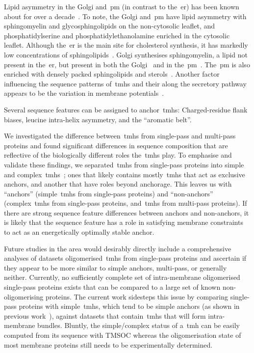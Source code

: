 Lipid asymmetry in the Golgi and~\gls{pm} (in contrast to the~\gls{er}) has been known about for over a decade~\cite{Daleke2007, Devaux2004}.
To note, the Golgi and~\gls{pm} have lipid asymmetry with sphingomyelin and glycosphingolipids on the non-cytosolic leaflet, and phosphatidylserine and phosphatidylethanolamine enriched in the cytosolic leaflet.
Although the~\gls{er} is the main site for cholesterol synthesis, it has markedly low concentrations of sphingolipids~\cite{Bell1981}.
Golgi synthesises sphingomyelin, a lipid not present in the~\gls{er}, but present in both the Golgi~\cite{Futerman2005} and in the~\gls{pm}~\cite{Li2007, Tafesse2007}.
The~\gls{pm} is also enriched with densely packed sphingolipids and sterols~\cite{Paolo2006}.
Another factor influencing the sequence patterns of~\gls{tmh}s and their along the secretory pathway appears to be the variation in membrane potentials~\cite{Qin2011, Worley1994, Schapiro2000}.

Several sequence features can be assigned to anchor~\gls{tmh}s: Charged-residue flank biases, leucine intra-helix asymmetry, and the ``aromatic belt''.

We investigated the difference between~\gls{tmh}s from single-pass and multi-pass proteins and found significant differences in sequence composition that are reflective of the biologically different roles the~\gls{tmh}s play.
To emphasise and validate these findings, we separated~\gls{tmh}s from single-pass proteins into simple and complex~\gls{tmh}s~\cite{Wong2011, Wong2012}; ones that likely contains mostly~\gls{tmh}s that act as exclusive anchors, and another that have roles beyond anchorage.
This leaves us with ``anchors'' (simple~\gls{tmh}s from single-pass proteins) and ``non-anchors'' (complex~\gls{tmh}s from single-pass proteins, and~\gls{tmh}s from multi-pass proteins).
If there are strong sequence feature differences between anchors and non-anchors, it is likely that the sequence feature has a role in satisfying membrane constraints to act as an energetically optimally stable anchor.

Future studies in the area would desirably directly include a comprehensive analyses of datasets oligomerised~\gls{tmh}s from single-pass proteins and ascertain if they appear to be more similar to simple anchors, multi-pass, or generally neither.
Currently, no sufficiently complete set of intra-membrane oligomerised single-pass proteins exists that can be compared to a large set of known non-oligomerising proteins.
The current work sidesteps this issue by comparing single-pass proteins with simple~\gls{tmh}s, which tend to be simple anchors (as shown in previous work~\cite{Wong2011, Wong2012}), against datasets that contain~\gls{tmh}s that will form intra-membrane bundles.
Bluntly, the simple/complex status of a~\gls{tmh} can be easily computed from its sequence with TMSOC whereas the oligomerisation state of most membrane proteins still needs to be experimentally determined.

